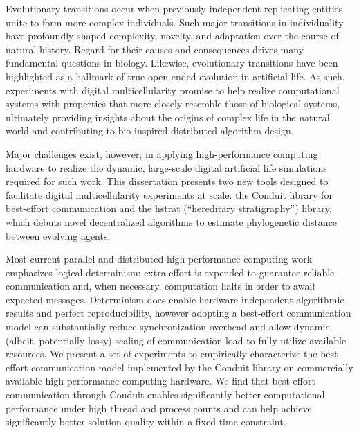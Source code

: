Evolutionary transitions occur when previously-independent replicating entities unite to form more complex individuals.
Such major transitions in individuality have profoundly shaped complexity, novelty, and adaptation over the course of natural history.
Regard for their causes and consequences drives many fundamental questions in biology.
Likewise, evolutionary transitions have been highlighted as a hallmark of true open-ended evolution in artificial life.
As such, experiments with digital multicellularity promise to help realize computational systems with properties that more closely resemble those of biological systems, ultimately providing insights about the origins of complex life in the natural world and contributing to bio-inspired distributed algorithm design.

Major challenges exist, however, in applying high-performance computing hardware to realize the dynamic, large-scale digital artificial life simulations required for such work.
This dissertation presents two new tools designed to facilitate digital multicellularity experiments at scale: the Conduit library for best-effort communication and the hstrat (``hereditary stratigraphy'') library, which debuts novel decentralized algorithms to estimate phylogenetic distance between evolving agents.

Most current parallel and distributed high-performance computing work emphasizes logical determinism: extra effort is expended to guarantee reliable communication and, when necessary, computation halts in order to await expected messages.
Determinism does enable hardware-independent algorithmic results and perfect reproducibility, however adopting a best-effort communication model can substantially reduce synchronization overhead and allow dynamic (albeit, potentially lossy) scaling of communication load to fully utilize available resources.
We present a set of experiments to empirically characterize the best-effort communication model implemented by the Conduit library on commercially available high-performance computing hardware.
We find that best-effort communication through Conduit enables significantly better computational performance under high thread and process counts and can help achieve significantly better solution quality within a fixed time constraint.

